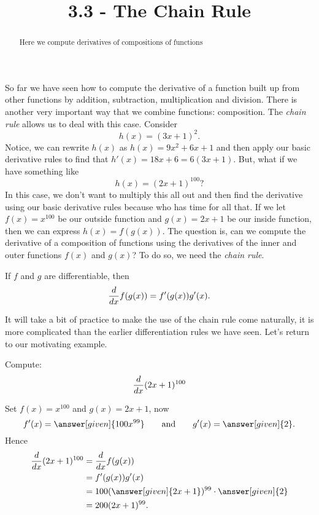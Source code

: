 \documentclass{ximera}
\title{3.3 - The Chain Rule}
\begin{document}
\begin{abstract}
  Here we compute derivatives of compositions of functions
\end{abstract}
\maketitle


So far we have seen how to compute the derivative of a function built up from other functions by addition, subtraction, multiplication and
division. There is another very important way that we combine
functions: composition. The \textit{chain rule} allows us to deal with
this case. Consider
\[
h(x) = (3x+1)^2.
\] 
Notice, we can rewrite $h(x)$ as $h(x)=9x^2+6x+1$ and then apply our basic derivative rules to find that $h'(x)=18x+6=6(3x+1)$. But, what if we have something like 
\[h(x)=(2x+1)^{100}?\]
In this case, we don't want to multiply this all out and then find the derivative using our basic derivative rules because who has time for all that.
If we let $f(x) = x^{100}$ be our outside function and $g(x) = 2x+1$ be our inside function, then we can express
$h(x) = f(g(x))$. The question is, can we compute the derivative of a
composition of functions using the derivatives of the inner and outer functions
$f(x)$ and $g(x)$? To do so, we need the \textit{chain rule}.



\begin{theorem}
If $f$ and $g$ are differentiable, then
\[
\frac{d}{\mathop{}\!d x} f(g(x)) = f'(g(x))g'(x).
\]
\end{theorem}



It will take a bit of practice to make the use of the chain rule come
naturally, it is more complicated than the earlier differentiation
rules we have seen. Let's return to our motivating example.

\begin{example}
Compute:
\[
\frac{d}{\mathop{}\!d x} (2x+1)^{100}
\]

\begin{explanation}
Set $f(x) = x^{100}$ and $g(x) = 2x+1$, now
\[
f'(x) = \answer[given]{100x^{99}} \qquad\text{and}\qquad g'(x) = \answer[given]{2}.
\]
Hence
\begin{align*}
\ddx (2x+1)^{100} &= \ddx f(g(x))\\ 
&=f'(g(x))g'(x) \\
&= 100(\answer[given]{2x+1})^{99}\cdot \answer[given]{2}\\
&= 200(2x+1)^{99}.
\end{align*}
\end{explanation}
\end{example}
\end{document}
